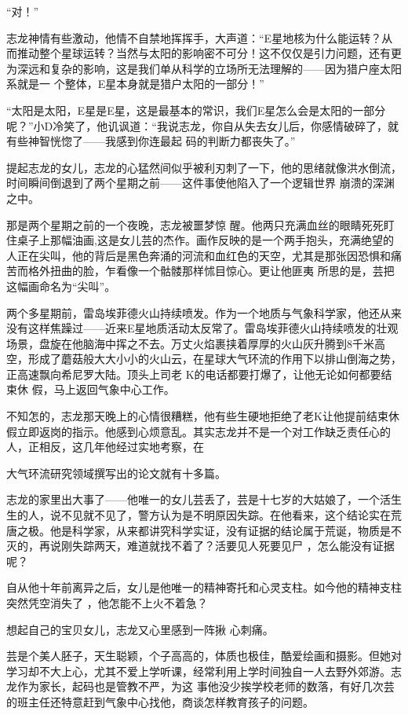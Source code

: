 \documentclass{article}
\begin{document}
“对！” 

志龙神情有些激动，他情不自禁地挥挥手，大声道：“E星地核为什么能运转？从而推动整个星球运转？当然与太阳的影响密不可分！这不仅仅是引力问题，还有更为深远和复杂的影响，这是我们单从科学的立场所无法理解的——因为猎户座太阳系就是一
个整体，E星本身就是猎户太阳的一部分！” 

“太阳是太阳，E星是E星，这是最基本的常识，我们E星怎么会是太阳的一部分呢？”小D冷笑了，他讥讽道：“我说志龙，你自从失去女儿后，你感情破碎了，就有些神智恍惚了——我感到你连最起
码的判断力都丧失了。” 

提起志龙的女儿，志龙的心猛然间似乎被利刃刺了一下，他的思绪就像洪水倒流，时间瞬间倒退到了两个星期之前——这件事使他陷入了一个逻辑世界
崩溃的深渊之中。 

那是两个星期之前的一个夜晚，志龙被噩梦惊
\newpage
醒。他两只充满血丝的眼睛死死盯住桌子上那幅油画,这是女儿芸的杰作。画作反映的是一个两手抱头，充满绝望的人正在尖叫，他的背后是黑色奔涌的河流和血红色的天空，尤其是那张因恐惧和痛苦而格外扭曲的脸，乍看像一个骷髅那样怵目惊心。更让他匪夷
所思的是，芸把这幅画命名为“尖叫”。 

两个多星期前，雷岛埃菲德火山持续喷发。作为一个地质与气象科学家，他还从来没有这样焦躁过——近来E星地质活动太反常了。雷岛埃菲德火山持续喷发的壮观场景，盘旋在他脑海中挥之不去。万丈火焰裹挟着厚厚的火山灰升腾到8千米高空，形成了蘑菇般大大小小的火山云，在星球大气环流的作用下以排山倒海之势，正高速飘向希尼罗大陆。顶头上司老 K的电话都要打爆了，让他无论如何都要结束休
假，马上返回气象中心工作。 

不知怎的，志龙那天晚上的心情很糟糕，他有些生硬地拒绝了老K让他提前结束休假立即返岗的指示。他感到心烦意乱。其实志龙并不是一个对工作缺乏责任心的人，正相反，这几年他经过实地考察，在
\newpage

大气环流研究领域撰写出的论文就有十多篇。 

志龙的家里出大事了——他唯一的女儿芸丢了，芸是十七岁的大姑娘了，一个活生生的人，说不见就不见了，警方认为是不明原因失踪。在他看来，这个结论实在荒唐之极。他是科学家，从来都讲究科学实证，没有证据的结论属于荒诞，物质是不灭的，再说刚失踪两天，难道就找不着了？活要见人死要见尸
，怎么能没有证据呢？ 

自从他十年前离异之后，女儿是他唯一的精神寄托和心灵支柱。如今他的精神支柱突然凭空消失了
，他怎能不上火不着急？ 

想起自己的宝贝女儿，志龙又心里感到一阵揪
心刺痛。 

芸是个美人胚子，天生聪颖，个子高高的，体质也极佳，酷爱绘画和摄影。但她对学习却不大上心，尤其不爱上学听课，经常利用上学时间独自一人去野外郊游。志龙作为家长，起码也是管教不严，为这
\newpage
事他没少挨学校老师的数落，有好几次芸的班主任还特意赶到气象中心找他，商谈怎样教育孩子的问题。
 
\end{document}
